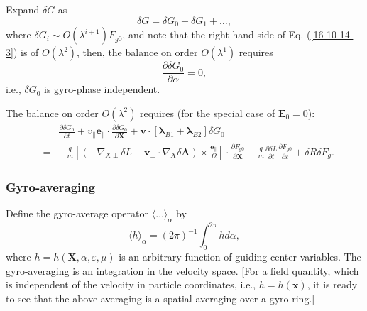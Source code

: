 \documentclass{article}
\newcommand{\tmmathbf}[1]{\ensuremath{\boldsymbol{#1}}}
\begin{document}
Expand $\delta G$ as
\[ \delta G = \delta G_0 + \delta G_1 + \ldots, \]
where $\delta G_i \sim O (\lambda^{i + 1}) F_{g 0}$, and note that the
right-hand side of Eq. (\ref{16-10-14-3}) is of $O (\lambda^2)$, then, the
balance on order $O (\lambda^1)$ requires
\begin{equation}
  \frac{\partial \delta G_0}{\partial \alpha} = 0,
\end{equation}
i.e., $\delta G_0$ is gyro-phase independent.

The balance on order $O (\lambda^2)$ requires (for the special case of
$\mathbf{E}_0 = 0$):
\begin{eqnarray}
  &  & \frac{\partial \delta G_0}{\partial t} + v_{\parallel}
  \mathbf{e}_{\parallel} \cdot \frac{\partial \delta G_0}{\partial \mathbf{X}}
  +\mathbf{v} \cdot [\tmmathbf{\lambda}_{B 1} +\tmmathbf{\lambda}_{B 2}]
  \delta G_0 \nonumber\\
  & = & - \frac{q}{m} \left[ (- \nabla_{X \perp} \delta L -\mathbf{v}_{\perp}
  \cdot \nabla_X \delta \mathbf{A}) \times
  \frac{\tmmathbf{e}_{\parallel}}{\Omega} \right] \cdot \frac{\partial F_{g
  0}}{\partial \mathbf{X}} - \frac{q}{m}  \frac{\partial \delta L}{\partial t}
  \frac{\partial F_{g 0}}{\partial \varepsilon} + \delta R \delta F_g . 
  \label{18-9-11-p1}
\end{eqnarray}

\subsubsection{Gyro-averaging}

Define the gyro-average operator $\langle \ldots \rangle_{\alpha}$ by
\begin{equation}
  \langle h \rangle_{\alpha} = (2 \pi)^{- 1} \int_0^{2 \pi} h d \alpha,
\end{equation}
where $h = h (\mathbf{X}, \alpha, \varepsilon, \mu)$ is an arbitrary function
of guiding-center variables. The gyro-averaging is an integration in the
velocity space. [For a field quantity, which is independent of the velocity in
particle coordinates, i.e., $h = h (\mathbf{x})$, it is ready to see that the
above averaging is a spatial averaging over a gyro-ring.]
\end{document}
